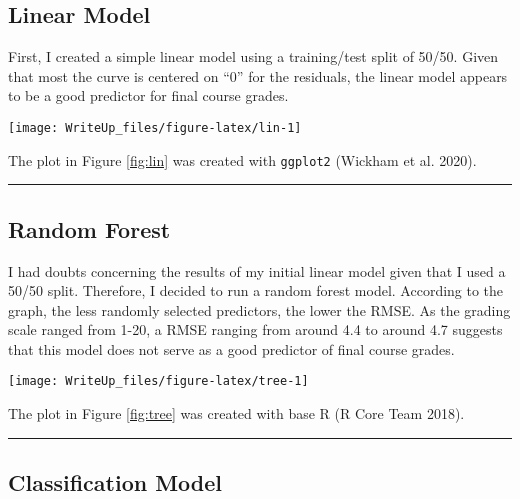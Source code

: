 \documentclass[
]{article}
\begin{document}
\hypertarget{linear-model}{%
\subsection*{Linear Model}\label{linear-model}}

First, I created a simple linear model using a training/test split of 50/50. Given that most the curve is centered on ``0'' for the residuals, the linear model appears to be a good predictor for final course grades.

\begin{center}\texttt{[image: WriteUp\_files/figure-latex/lin-1]} \end{center}

The plot in Figure \ref{fig:lin} was created with \texttt{ggplot2} (Wickham et al. 2020).

\begin{center}\rule{0.5\linewidth}{0.5pt}\end{center}

\hypertarget{random-forest}{%
\subsection*{Random Forest}\label{random-forest}}

I had doubts concerning the results of my initial linear model given that I used a 50/50 split. Therefore, I decided to run a random forest model. According to the graph, the less randomly selected predictors, the lower the RMSE. As the grading scale ranged from 1-20, a RMSE ranging from around 4.4 to around 4.7 suggests that this model does not serve as a good predictor of final course grades.

\begin{center}\texttt{[image: WriteUp\_files/figure-latex/tree-1]} \end{center}

The plot in Figure \ref{fig:tree} was created with base R (R Core Team 2018).

\begin{center}\rule{0.5\linewidth}{0.5pt}\end{center}

\hypertarget{classification-model}{%
\subsection*{Classification Model}\label{classification-model}}
\end{document}
